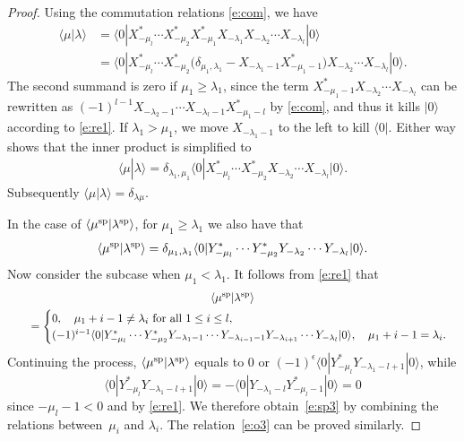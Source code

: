 \documentclass[10pt,a4paper]{amsart}
\numberwithin{equation}{section}
\begin{document}
\begin{proof}
Using the commutation relations \eqref{e:com}, we have
\begin{align*}
\langle\mu|\lambda\rangle &= \langle 0|X^*_{-\mu_l}\cdots X^*_{-\mu_2}X^*_{-\mu_1}X_{-\lambda_1}X_{-\lambda_2}\cdots X_{-\lambda_l}|0\rangle\\
&= \langle 0|X^*_{-\mu_l}\cdots X^*_{-\mu_2}\big(\delta_{\mu_1,\lambda_1}-X_{-\lambda_1-1}X^*_{-\mu_1-1}\big)X_{-\lambda_2}\cdots X_{-\lambda_l}|0\rangle.
\end{align*}
The second summand is zero if $\mu_1\geq\lambda_1$, since the term $X^*_{-\mu_1-1}X_{-\lambda_2}\cdots X_{-\lambda_l}$ can be rewritten as $(-1)^{l-1}X_{-\lambda_2-1}\cdots X_{-\lambda_l-1}X^*_{-\mu_1-l}$ by \eqref{e:com}, and thus it
kills $|0\rangle$ according to \eqref{e:re1}. If $\lambda_1>\mu_1$, we move $X_{-\lambda_1-1}$ to the left
to kill $\langle 0|$. Either way shows that the inner product is simplified
to
\begin{align*}
\langle\mu|\lambda\rangle=\delta_{\lambda_1,\mu_1}\langle 0|X^*_{-\mu_l}\cdots X^*_{-\mu_2}X_{-\lambda_2}\cdots X_{-\lambda_l}|0\rangle.
\end{align*}
Subsequently $\langle\mu|\lambda\rangle=\delta_{\lambda\mu}$.

In the case of $\langle \mu^{\rm sp}|\lambda^{\rm sp}\rangle$, for $\mu_1\geq\lambda_1$ we also have that
\begin{align*}
\langle \mu^{\rm sp}|\lambda^{\rm sp}\rangle=\delta_{\mu_1,\lambda_1}\langle 0|Y^*_{-\mu_l}\cdots Y^*_{-\mu_2}Y_{-\lambda_2}\cdots Y_{-\lambda_l}|0\rangle.
\end{align*}
Now consider the subcase when $\mu_1<\lambda_1$. It follows from \eqref{e:re1} that
\begin{gather*}
\langle \mu^{\rm sp}|\lambda^{\rm sp}\rangle\\
\qquad=\begin{cases}
0, \quad \mu_1+i-1\neq \lambda_i \ \text{for all} \ 1\leq i\leq l,\\
(-1)^{i-1}\langle 0|Y^*_{-\mu_l}\cdots Y^*_{-\mu_2}Y_{-\lambda_1-1}\cdots Y_{-\lambda_{i-1}-1}Y_{-\lambda_{i+1}} \cdots Y_{-\lambda_l}|0\rangle, \quad \mu_1+i-1= \lambda_i.
\end{cases}\!
\end{gather*}
Continuing the process, $\langle \mu^{\rm sp}|\lambda^{\rm sp}\rangle$ equals to 0 or $(-1)^\epsilon\langle 0|Y^*_{-\mu_l}Y_{-\lambda_1-l+1}|0\rangle$, while
\[
\langle 0|Y^*_{-\mu_l}Y_{-\lambda_1-l+1}|0\rangle=-\langle 0|Y_{-\lambda_1-l}Y^*_{-\mu_l-1}|0\rangle=0
\]
 since $-\mu_l-1<0$ and by \eqref{e:re1}. We therefore obtain~\eqref{e:sp3} by combining the relations between~$\mu_i$ and $\lambda_i$. The relation~\eqref{e:o3} can be proved similarly.
\end{proof}
\end{document}

